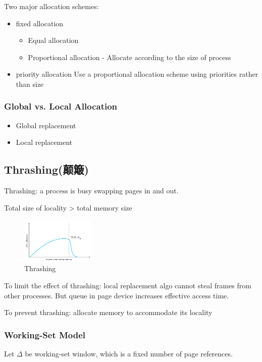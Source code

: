 Two major allocation schemes:
\begin{itemize}
    \item fixed allocation
    \begin{itemize}\scriptsize
        \item Equal allocation
        \item Proportional allocation - Allocate according to the size of process
    \end{itemize}
    \item priority allocation
    \subitem Use a proportional allocation scheme using priorities rather than size
\end{itemize}

\subsubsection{Global vs. Local Allocation}
\begin{itemize}%
    \item Global replacement
    \item Local replacement
\end{itemize}

\subsection{Thrashing(颠簸)}
Thrashing: a process is busy swapping pages in and out. 

Total size of locality > total memory size
\begin{figure}[!htb]
    \centering
    \includegraphics[width=0.309\textwidth]{pic/OS9/Thrashing}
    \caption{Thrashing}
\end{figure}

To limit the effect of thrashing: local replacement algo cannot
steal frames from other processes. But queue in page device
increases effective access time.

To prevent thrashing: allocate memory to accommodate its
locality

\subsubsection{Working-Set Model}
Let $\Delta$ be working-set window, which is a fixed number of page references. 

